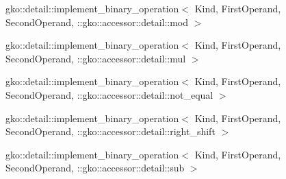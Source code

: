 \begin{DoxyCompactList}
\begin{DoxyCompactList}
\item {}
\end{DoxyCompactList}
\item gko\+:\+:detail\+:\+:implement\+\_\+binary\+\_\+operation$<$ Kind, First\+Operand, Second\+Operand, \+:\+:gko\+:\+:accessor\+:\+:detail\+:\+:mod $>$\begin{DoxyCompactList}
\item {}
\end{DoxyCompactList}
\item gko\+:\+:detail\+:\+:implement\+\_\+binary\+\_\+operation$<$ Kind, First\+Operand, Second\+Operand, \+:\+:gko\+:\+:accessor\+:\+:detail\+:\+:mul $>$\begin{DoxyCompactList}
\item {}
\end{DoxyCompactList}
\item gko\+:\+:detail\+:\+:implement\+\_\+binary\+\_\+operation$<$ Kind, First\+Operand, Second\+Operand, \+:\+:gko\+:\+:accessor\+:\+:detail\+:\+:not\+\_\+equal $>$\begin{DoxyCompactList}
\item {}
\end{DoxyCompactList}
\item gko\+:\+:detail\+:\+:implement\+\_\+binary\+\_\+operation$<$ Kind, First\+Operand, Second\+Operand, \+:\+:gko\+:\+:accessor\+:\+:detail\+:\+:right\+\_\+shift $>$\begin{DoxyCompactList}
\item {}
\end{DoxyCompactList}
\item gko\+:\+:detail\+:\+:implement\+\_\+binary\+\_\+operation$<$ Kind, First\+Operand, Second\+Operand, \+:\+:gko\+:\+:accessor\+:\+:detail\+:\+:sub $>$\begin{DoxyCompactList}

\end{DoxyCompactList}
\end{DoxyCompactList}
